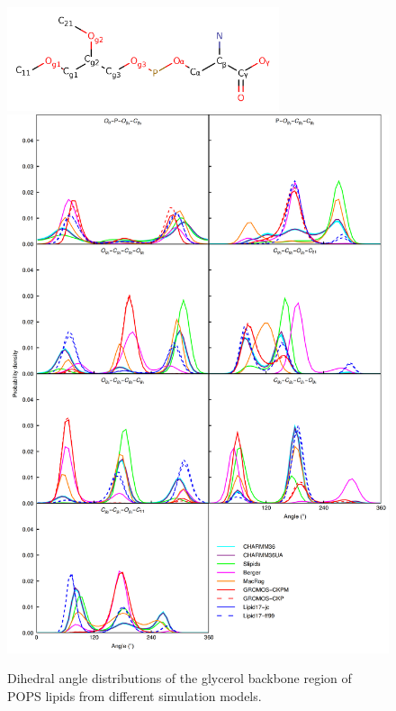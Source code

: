 \documentclass[journal=jpcbfk,manuscript=article]{achemso}
\begin{document}
\begin{figure}[]
  \centering
    \includegraphics[width=8.0cm]{../Figs/PS_Labels.png}
  \includegraphics[width=13.0cm]{../Figs/figS6.png}
  \caption{\label{dihedralsGLY}
    Dihedral angle distributions of the glycerol backbone region of POPS lipids from different simulation models.
  }
\end{figure}
\end{document}
